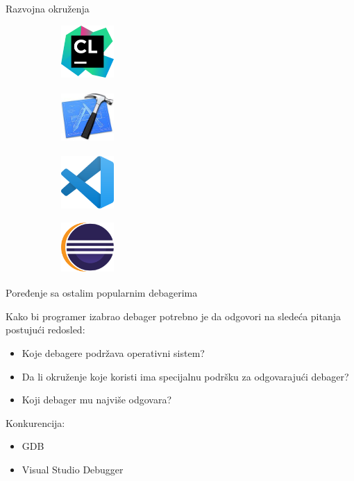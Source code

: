 \documentclass[bookmarks=true,bookmarksopen=true,pdfborder={0 0 0},pdfhighlight={/N},linkbordercolor={.5 .5 .5},implicit=false,unicode,xcolor={table}]{beamer}
\begin{document}
\begin{frame}{Razvojna okruženja}
\begin{figure}
	
	\begin{subfigure}{2cm}
		\includegraphics[width=2cm,height=2cm]{clion_logo}
	\end{subfigure}
	\begin{subfigure}{2cm}
		\includegraphics[width=2cm,height=2cm]{xcode_logo}
	\end{subfigure}
	\begin{subfigure}{2cm}
		\includegraphics[width=2cm,height=2cm]{visual_code}
	\end{subfigure}
	\begin{subfigure}{2cm}
		\includegraphics[width=2cm,height=2cm]{eclipse_logo}
	\end{subfigure}
\end{figure}
\end{frame}

\begin{frame}{Poređenje sa ostalim popularnim debagerima}

	Kako bi programer izabrao debager potrebno je da odgovori na sledeća pitanja postujući redosled:
	\begin{itemize}
		\item Koje debagere podržava operativni sistem?
		\item Da li okruženje koje koristi ima specijalnu podršku za odgovarajući debager?
		\item Koji debager mu najviše odgovara?
	\end{itemize}

	Konkurencija:
	\begin{itemize}
		\item GDB
		\item Visual Studio Debugger
	\end{itemize}
	
\end{frame}
\end{document}
